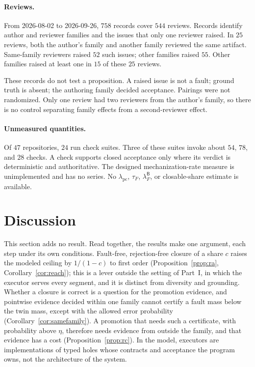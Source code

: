 \documentclass[11pt]{article}
\theoremstyle{definition}
\theoremstyle{remark}
\newcommand{\lpc}{\lambda_{\mathrm{pc}}}
\newcommand{\Bld}{\mathsf{B}}
\newcommand{\lFB}{\lambda_F^{\Bld}}
\begin{document}
\paragraph{Reviews.}
From 2026-08-02 to 2026-09-26, $758$ records cover $544$ reviews.
Records identify author and reviewer families and the issues that only one reviewer raised.
In $25$ reviews, both the author's family and another family reviewed the same artifact.
Same-family reviewers raised $52$ such issues; other families raised $55$.
Other families raised at least one in $15$ of these $25$ reviews.

These records do not test a proposition.
A raised issue is not a fault; ground truth is absent; the authoring family decided acceptance.
Pairings were not randomized.
Only one review had two reviewers from the author's family, so there is no control separating
family effects from a second-reviewer effect.

\paragraph{Unmeasured quantities.}
Of $47$ repositories, $24$ run check suites.
Three of these suites invoke about $54$, $78$, and $28$ checks.
A check supports closed acceptance only where its verdict is deterministic and authoritative.
The designed mechanization-rate measure is unimplemented and has no series.
No $\lpc$, $\tau_F$, $\lFB$, or closable-share estimate is available.

\section{Discussion}\label{sec:discussion}
This section adds no result. Read together, the results make one argument, each step under its own
conditions. Fault-free, rejection-free closure of a share $c$ raises the modeled ceiling by $1/(1-c)$ to first order
(Proposition~\ref{prop:ra}, Corollary~\ref{cor:reach}); this is a lever outside the setting of Part~I,
in which the executor serves every segment, and it is distinct from diversity and grounding. Whether a closure is correct is a question for the promotion
evidence, and pointwise evidence decided within one family cannot certify a fault mass below the twin
mass, except with the allowed error probability (Corollary~\ref{cor:samefamily}). A promotion that
needs such a certificate, with probability above $\eta$, therefore needs evidence from outside the
family, and that evidence has a cost (Proposition~\ref{prop:rc}). In the model, executors are
implementations of typed holes whose contracts and acceptance the program owns, not the architecture
of the system.
\end{document}
